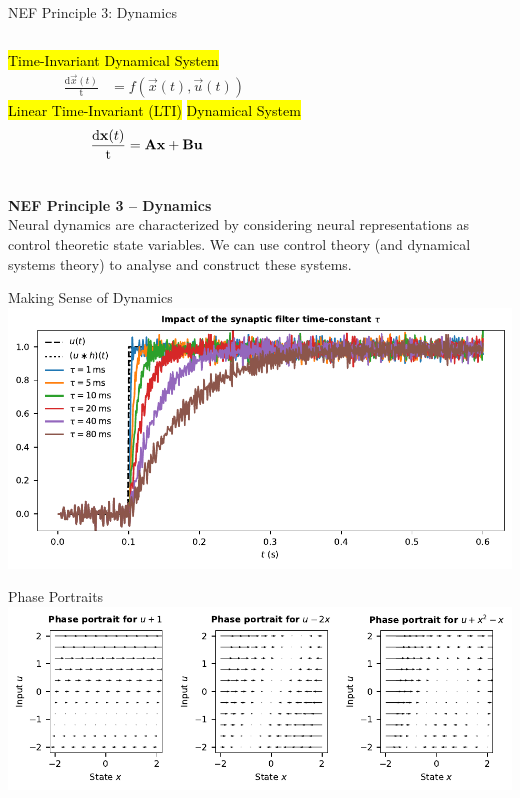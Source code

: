 \documentclass[handout,aspectratio=169]{beamer}
\begin{document}
	\begin{frame}{NEF Principle 3: Dynamics}
		\begin{columns}[b]
				\centering
				\hl{Time-Invariant Dynamical System}\\
				\begin{align*}
					\frac{\mathrm{d}\vec x(t)}{\mathrm{t}} &= f(\vec x(t), \vec u(t))
				\end{align*}
				\centering
				\hl{Linear Time-Invariant (LTI)}
				\hl{Dynamical System}
				\begin{align*}
					\frac{\mathrm{d}{\mathbf{x}}(t)}{\mathrm{t}} &= {\mathbf{A}} {\mathbf{x}} + {\mathbf{B}} {\mathbf{u}}
				\end{align*}
		\end{columns}
		\vspace{0.75cm}
		\begin{mdframed}
			\textbf{NEF Principle 3 -- Dynamics}\\
			Neural dynamics are characterized by considering neural representations as control theoretic state variables. We can use control theory (and dynamical systems theory) to analyse and construct these systems.
		\end{mdframed}
	\end{frame}

	\begin{frame}{Making Sense of Dynamics}
		\centering
		\includegraphics[width=\textwidth]{media/synaptic_filter.pdf} 		
	\end{frame}

	\begin{frame}{Phase Portraits}
		\centering
		\includegraphics[width=\textwidth]{media/phase_portraits.pdf}
	\end{frame}
\end{document}
